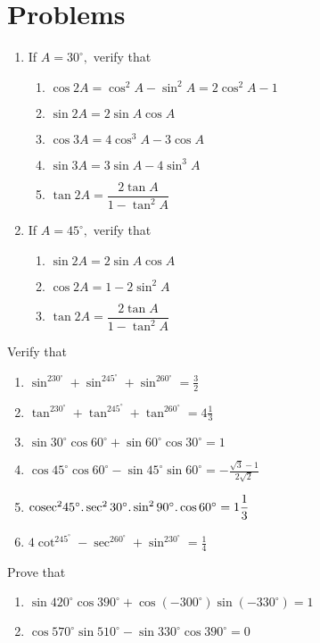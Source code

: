 \section{Problems}
\begin{enumerate}
\item If $A = 30^\circ,$ verify that
   \begin{enumerate}
   \item $\cos 2A = \cos^2A - \sin^2A = 2\cos^2A - 1$
   \item $\sin 2A = 2\sin A\cos A$
   \item $\cos 3A = 4\cos^3A - 3\cos A$
   \item $\sin 3A = 3\sin A - 4\sin^3A$
   \item $\tan 2A = \dfrac{2\tan A}{1 - \tan^2 A}$
   \end{enumerate}
\item If $A = 45^\circ,$ verify that
  \begin{enumerate}
  \item $\sin 2A = 2\sin A\cos A$
  \item $\cos 2A = 1 - 2\sin^2A$
  \item $\tan 2A = \dfrac{2\tan A}{1 - \tan^2A}$
  \end{enumerate}
\end{enumerate}

Verify that

\begin{enumerate}[resume]
\item $\sin^230^\circ + \sin^245^\circ + \sin^260^\circ = \frac{3}{2}$
\item $\tan^230^\circ + \tan^245^\circ + \tan^260^\circ = 4\frac{1}{3}$
\item $\sin 30^\circ\cos 60^\circ + \sin 60^\circ\cos 30^\circ = 1$
\item $\cos 45^\circ\cos 60^\circ - \sin 45^\circ\sin 60^\circ = -\frac{\sqrt{3} - 1}{2\sqrt{2}}$
\item ${\rm cosec}^245^\circ.\sec^230^\circ.\sin^290^\circ.\cos 60^\circ = 1\frac{1}{3}$
\item $4\cot^245^\circ-\sec^260^\circ + \sin^230^\circ = \frac{1}{4}$
\end{enumerate}

Prove that
\begin{enumerate}[resume]
\item $\sin 420^\circ\cos 390^\circ + \cos(-300^\circ)\sin(-330^\circ) = 1$
\item $\cos 570^\circ\sin 510^\circ -\sin 330^\circ\cos 390^\circ = 0$
\end{enumerate}

